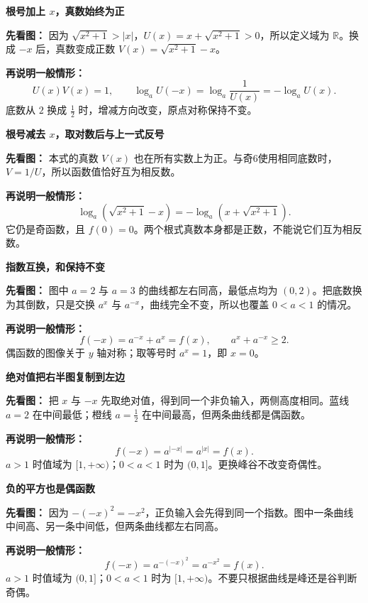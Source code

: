 \clearpage
\begin{explanationbox}
\textbf{\textcolor{CExplanation}{根号加上 $x$，真数始终为正}}

\textbf{先看图：} 因为 $\sqrt{x^2+1}>|x|$，$U(x)=x+\sqrt{x^2+1}>0$，所以定义域为 $\mathbb R$。换成 $-x$ 后，真数变成正数 $V(x)=\sqrt{x^2+1}-x$。

\textbf{再说明一般情形：}
\[
U(x)V(x)=1,\qquad \log_a U(-x)=\log_a\frac1{U(x)}=-\log_a U(x).
\]
底数从 $2$ 换成 $\frac12$ 时，增减方向改变，原点对称保持不变。
\end{explanationbox}
\clearpage
\begin{explanationbox}
\textbf{\textcolor{CExplanation}{根号减去 $x$，取对数后与上一式反号}}

\textbf{先看图：} 本式的真数 $V(x)$ 也在所有实数上为正。与奇6使用相同底数时，$V=1/U$，所以函数值恰好互为相反数。

\textbf{再说明一般情形：}
\[
\log_a(\sqrt{x^2+1}-x)=-\log_a(x+\sqrt{x^2+1}).
\]
它仍是奇函数，且 $f(0)=0$。两个根式真数本身都是正数，不能说它们互为相反数。
\end{explanationbox}
\clearpage
\begin{explanationbox}
\textbf{\textcolor{CExplanation}{指数互换，和保持不变}}

\textbf{先看图：} 图中 $a=2$ 与 $a=3$ 的曲线都左右同高，最低点均为 $(0,2)$。把底数换为其倒数，只是交换 $a^x$ 与 $a^{-x}$，曲线完全不变，所以也覆盖 $0<a<1$ 的情况。

\textbf{再说明一般情形：}
\[
f(-x)=a^{-x}+a^x=f(x),\qquad a^x+a^{-x}\ge2.
\]
偶函数的图像关于 $y$ 轴对称；取等号时 $a^x=1$，即 $x=0$。
\end{explanationbox}
\clearpage
\begin{explanationbox}
\textbf{\textcolor{CExplanation}{绝对值把右半图复制到左边}}

\textbf{先看图：} 把 $x$ 与 $-x$ 先取绝对值，得到同一个非负输入，两侧高度相同。蓝线 $a=2$ 在中间最低；橙线 $a=\frac12$ 在中间最高，但两条曲线都是偶函数。

\textbf{再说明一般情形：}
\[
f(-x)=a^{|-x|}=a^{|x|}=f(x).
\]
$a>1$ 时值域为 $[1,+\infty)$；$0<a<1$ 时为 $(0,1]$。更换峰谷不改变奇偶性。
\end{explanationbox}
\clearpage
\begin{explanationbox}
\textbf{\textcolor{CExplanation}{负的平方也是偶函数}}

\textbf{先看图：} 因为 $-(-x)^2=-x^2$，正负输入会先得到同一个指数。图中一条曲线中间高、另一条中间低，但两条曲线都左右同高。

\textbf{再说明一般情形：}
\[
f(-x)=a^{-(-x)^2}=a^{-x^2}=f(x).
\]
$a>1$ 时值域为 $(0,1]$；$0<a<1$ 时为 $[1,+\infty)$。不要只根据曲线是峰还是谷判断奇偶。
\end{explanationbox}
